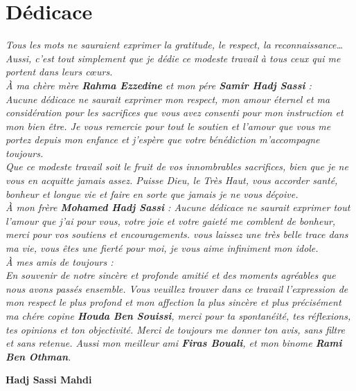 \documentclass[12pt]{report}
\begin{document}
\chapter*{\huge Dédicace}
\large{
\begin{center} 
\it \textsl{
 Tous les mots ne sauraient exprimer la gratitude, le respect, la
reconnaissance… Aussi, c’est tout simplement que je dédie ce modeste
travail à tous ceux qui me portent dans leurs cœurs.\\
\vspace*{1cm}
À ma chère mère \textbf{Rahma Ezzedine} et mon pére \textbf{Samir Hadj Sassi} :\\
Aucune dédicace ne saurait exprimer mon respect, mon amour
éternel et ma considération pour les sacrifices que vous avez consenti
pour mon instruction et mon bien être. Je vous remercie pour tout le
soutien et l’amour que vous me portez depuis mon enfance et j’espère
que votre bénédiction m’accompagne toujours.\\
Que ce modeste travail soit le fruit de vos innombrables sacrifices, bien
que je ne vous en acquitte jamais assez. Puisse Dieu, le Très Haut, vous
accorder santé, bonheur et longue vie et faire en sorte que jamais je ne
vous déçoive.\\\vspace*{1cm}
À mon frère \textbf{Mohamed Hadj Sassi} :
Aucune dédicace ne saurait exprimer tout l’amour que j’ai pour vous,
votre joie et votre gaieté me comblent de bonheur, merci pour vos soutiens et encouragements.
vous laissez une très belle trace dans ma vie, vous êtes une fierté pour moi, je vous aime infiniment mon idole.\\
\vspace*{1cm}
À mes amis de toujours : \\
En souvenir de notre sincère et profonde amitié et des moments
agréables que nous avons passés ensemble. Vous veuillez trouver dans
ce travail l’expression de mon respect le plus profond et mon affection
la plus sincère et plus précisément ma chére copine \textbf{Houda Ben Souissi}, merci pour ta spontanéité, tes réflexions, tes opinions et ton objectivité. Merci de toujours me donner ton avis, sans filtre et sans retenue. Aussi mon meilleur ami \textbf{Firas Bouali}, et mon binome \textbf{Rami Ben Othman}.
}
\begin{tabbing}
\hspace{13cm}  \textbf{\large{Hadj Sassi Mahdi}}
\end{tabbing}

\end{center}

}
\end{document}
